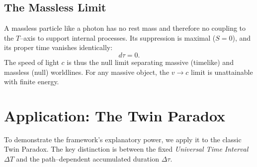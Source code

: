 \documentclass[12pt]{article}
\theoremstyle{plain}
\begin{document}
\subsection{The Massless Limit}
A massless particle like a photon has no rest mass and therefore no coupling to the $T$–axis to support internal processes. Its suppression is maximal ($S=0$), and its proper time vanishes identically:
\begin{equation}
d\tau=0.
\label{eq:PhotonNull}
\end{equation}
The speed of light $c$ is thus the null limit separating massive (timelike) and massless (null) worldlines. For any massive object, the $v\to c$ limit is unattainable with finite energy.

\section{Application: The Twin Paradox}
\label{sec:twin-paradox}
To demonstrate the framework's explanatory power, we apply it to the classic Twin Paradox. 
The key distinction is between the fixed \emph{Universal Time Interval} $\Delta T$ and the path–dependent 
accumulated duration $\Delta\tau$.
\end{document}
